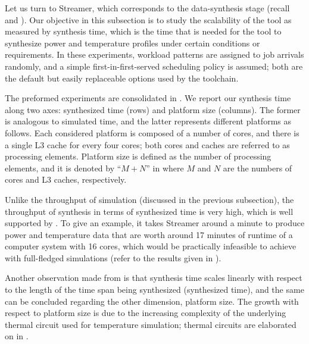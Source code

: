 
Let us turn to Streamer, which corresponds to the data-synthesis stage (recall
 and ). Our objective in this subsection is to
study the scalability of the tool as measured by synthesis time, which is the
time that is needed for the tool to synthesize power and temperature profiles
under certain conditions or requirements. In these experiments, workload
patterns are assigned to job arrivals randomly, and a simple
first-in-first-served scheduling policy is assumed; both are the default but
easily replaceable options used by the toolchain.

The preformed experiments are consolidated in . We report our
synthesis time along two axes: synthesized time (rows) and platform size
(columns). The former is analogous to simulated time, and the latter represents
different platforms as follows. Each considered platform is composed of a number
of cores, and there is a single L3 cache for every four cores; both cores and
caches are referred to as processing elements. Platform size is defined as the
number of processing elements, and it is denoted by ``$M + N$'' in
 where $M$ and $N$ are the numbers of cores and L3 caches,
respectively.

Unlike the throughput of simulation (discussed in the previous subsection), the
throughput of synthesis in terms of synthesized time is very high, which is well
supported by . To give an example, it takes Streamer around a
minute to produce power and temperature data that are worth around 17 minutes of
runtime of a computer system with 16 cores, which would be practically
infeasible to achieve with full-fledged simulations (refer to the results given
in ).

Another observation made from  is that synthesis time scales
linearly with respect to the length of the time span being synthesized
(synthesized time), and the same can be concluded regarding the other dimension,
platform size. The growth with respect to platform size is due to the increasing
complexity of the underlying thermal  circuit used for temperature
simulation; thermal circuits are elaborated on in .
